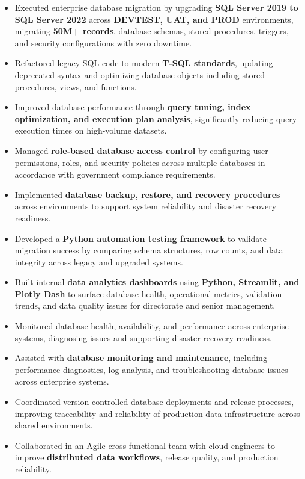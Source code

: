 \documentclass[a4paper]{article}
\begin{document}
\begin{itemize} \itemsep -2pt
\item Executed enterprise database migration by upgrading \textbf{SQL Server 2019 to SQL Server 2022} across \textbf{DEVTEST, UAT, and PROD} environments, migrating \textbf{50M+ records}, database schemas, stored procedures, triggers, and security configurations with zero downtime.
\item Refactored legacy SQL code to modern \textbf{T-SQL standards}, updating deprecated syntax and optimizing database objects including stored procedures, views, and functions.
\item Improved database performance through \textbf{query tuning, index optimization, and execution plan analysis}, significantly reducing query execution times on high-volume datasets.
\item Managed \textbf{role-based database access control} by configuring user permissions, roles, and security policies across multiple databases in accordance with government compliance requirements.
\item Implemented \textbf{database backup, restore, and recovery procedures} across environments to support system reliability and disaster recovery readiness.
\item Developed a \textbf{Python automation testing framework} to validate migration success by comparing schema structures, row counts, and data integrity across legacy and upgraded systems.
\item Built internal \textbf{data analytics dashboards} using \textbf{Python, Streamlit, and Plotly Dash} to surface database health, operational metrics, validation trends, and data quality issues for directorate and senior management.
\item Monitored database health, availability, and performance across enterprise systems, diagnosing issues and supporting disaster-recovery readiness.
\item Assisted with \textbf{database monitoring and maintenance}, including performance diagnostics, log analysis, and troubleshooting database issues across enterprise systems.
\item Coordinated version-controlled database deployments and release processes, improving traceability and reliability of production data infrastructure across shared environments.
\item Collaborated in an Agile cross-functional team with cloud engineers to improve \textbf{distributed data workflows}, release quality, and production reliability.
\end{itemize}
\end{document}
